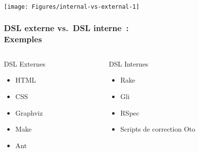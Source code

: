 \begin{frame}[plain]
\texttt{[image: Figures/internal-vs-external-1]}
\NOTE{\ }
\end{frame}



\begin{frame}
\frametitle{DSL externe vs.\ DSL interne~:\\Exemples}


\begin{columns}
\begin{column}{5cm}
\begin{block}{{DSL Externes}}
\begin{itemize}
\item HTML
\item CSS
\item Graphviz
\item Make
\item Ant
\end{itemize}
\end{block}
\end{column}

\begin{column}{5cm}
\begin{block}{{DSL Internes}}
\begin{itemize}
\item Rake
\item Gli
\item RSpec
\item Scripts de correction Oto
\end{itemize}
\end{block}
\end{column}
\end{columns}

\vfill

\NOTE{\ }

\end{frame}

